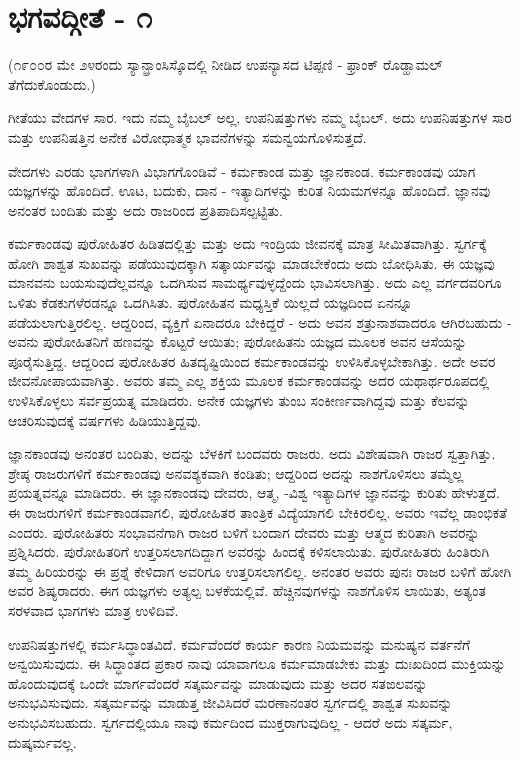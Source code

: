
\chapter{ಭಗವದ್ಗೀತೆ - ೧}

(೧೯೦೦ರ ಮೇ ೨೪ರಂದು ಸ್ಯಾನ್ಫ್ರಾಂಸಿಸ್ಕೊದಲ್ಲಿ ನೀಡಿದ ಉಪನ್ಯಾಸದ ಟಿಪ್ಪಣಿ - ಫ್ರಾಂಕ್ ರೊಡ್ಹಾಮಲ್ ತೆಗೆದುಕೊಂಡುದು.)

ಗೀತೆಯು ವೇದಗಳ ಸಾರ. ಇದು ನಮ್ಮ ಬೈಬಲ್ ಅಲ್ಲ, ಉಪನಿಷತ್ತುಗಳು ನಮ್ಮ ಬೈಬಲ್. ಅದು ಉಪನಿಷತ್ತುಗಳ ಸಾರ ಮತ್ತು ಉಪನಿಷತ್ತಿನ ಅನೇಕ ವಿರೋಧಾತ್ಮಕ ಭಾವನೆಗಳನ್ನು ಸಮನ್ವಯಗೊಳಿಸುತ್ತದೆ.

ವೇದಗಳು ಎರಡು ಭಾಗಗಳಾಗಿ ವಿಭಾಗಗೊಂಡಿವೆ - ಕರ್ಮಕಾಂಡ ಮತ್ತು ಜ್ಞಾನಕಾಂಡ. ಕರ್ಮಕಾಂಡವು ಯಾಗ ಯಜ್ಞಗಳನ್ನು ಹೊಂದಿದೆ. ಊಟ, ಬದುಕು, ದಾನ - ಇತ್ಯಾದಿಗಳನ್ನು ಕುರಿತ ನಿಯಮಗಳನ್ನೂ ಹೊಂದಿದೆ. ಜ್ಞಾನವು ಅನಂತರ ಬಂದಿತು ಮತ್ತು ಅದು ರಾಜರಿಂದ ಪ್ರತಿಪಾದಿಸಲ್ಪಟ್ಟಿತು.

ಕರ್ಮಕಾಂಡವು ಪುರೋಹಿತರ ಹಿಡಿತದಲ್ಲಿತ್ತು ಮತ್ತು ಅದು ಇಂದ್ರಿಯ ಜೀವನಕ್ಕೆ ಮಾತ್ರ ಸೀಮಿತವಾಗಿತ್ತು. ಸ್ವರ್ಗಕ್ಕೆ ಹೋಗಿ ಶಾಶ್ವತ ಸುಖವನ್ನು ಪಡೆಯುವುದಕ್ಕಾಗಿ ಸತ್ಕಾರ್ಯವನ್ನು ಮಾಡಬೇಕೆಂದು ಅದು ಬೋಧಿಸಿತು. ಈ ಯಜ್ಞವು ಮಾನವನು ಬಯಸುವುದೆಲ್ಲವನ್ನೂ ಒದಗಿಸುವ ಸಾಮರ್ಥ್ಯವುಳ್ಳದ್ದೆಂದು ಭಾವಿಸಲಾಗಿತ್ತು. ಅದು ಎಲ್ಲ ವರ್ಗದವರಿಗೂ ಒಳಿತು ಕೆಡಕುಗಳೆರಡನ್ನೂ ಒದಗಿಸಿತು. ಪುರೋಹಿತನ ಮಧ್ಯಸ್ತಿಕೆ ಯಿಲ್ಲದೆ ಯಜ್ಞದಿಂದ ಏನನ್ನೂ ಪಡೆಯಲಾಗುತ್ತಿರಲಿಲ್ಲ. ಆದ್ದರಿಂದ, ವ್ಯಕ್ತಿಗೆ ಏನಾದರೂ ಬೇಕಿದ್ದರೆ - ಅದು ಅವನ ಶತ್ರುನಾಶವಾದರೂ ಆಗಿರಬಹುದು - ಅವನು ಪುರೋಹಿತನಿಗೆ ಹಣವನ್ನು ಕೊಟ್ಟರೆ ಆಯಿತು; ಪುರೋಹಿತನು ಯಜ್ಞದ ಮೂಲಕ ಅವನ ಆಸೆಯನ್ನು ಪೂರೈಸುತ್ತಿದ್ದ. ಆದ್ದರಿಂದ ಪುರೋಹಿತರ ಹಿತದೃಷ್ಟಿಯಿಂದ ಕರ್ಮಕಾಂಡವನ್ನು ಉಳಿಸಿಕೊಳ್ಳಬೇಕಾಗಿತ್ತು. ಅದೇ ಅವರ ಜೀವನೋಪಾಯವಾಗಿತ್ತು. ಅವರು ತಮ್ಮ ಎಲ್ಲ ಶಕ್ತಿಯ ಮೂಲಕ ಕರ್ಮಕಾಂಡವನ್ನು ಅದರ ಯಥಾರ್ಥರೂಪದಲ್ಲಿ ಉಳಿಸಿಕೊಳ್ಳಲು ಸರ್ವಪ್ರಯತ್ನ ಮಾಡಿದರು. ಅನೇಕ ಯಜ್ಞಗಳು ತುಂಬ ಸಂಕೀರ್ಣವಾಗಿದ್ದವು ಮತ್ತು ಕೆಲವನ್ನು ಆಚರಿಸುವುದಕ್ಕೆ ವರ್ಷಗಳು ಹಿಡಿಯುತ್ತಿದ್ದವು.

ಜ್ಞಾನಕಾಂಡವು ಅನಂತರ ಬಂದಿತು, ಅದನ್ನು ಬೆಳಕಿಗೆ ಬಂದವರು ರಾಜರು. ಅದು ವಿಶೇಷವಾಗಿ ರಾಜರ ಸ್ವತ್ತಾಗಿತ್ತು. ಶ್ರೇಷ್ಠ ರಾಜರುಗಳಿಗೆ ಕರ್ಮಕಾಂಡವು ಅನವಶ್ಯಕವಾಗಿ ಕಂಡಿತು; ಆದ್ದರಿಂದ ಅದನ್ನು ನಾಶಗೊಳಿಸಲು ತಮ್ಮೆಲ್ಲ ಪ್ರಯತ್ನವನ್ನೂ ಮಾಡಿದರು. ಈ ಜ್ಞಾನಕಾಂಡವು ದೇವರು, ಆತ್ಮ, -ವಿಶ್ವ ಇತ್ಯಾದಿಗಳ ಜ್ಞಾನವನ್ನು ಕುರಿತು ಹೇಳುತ್ತದೆ. ಈ ರಾಜರುಗಳಿಗೆ ಕರ್ಮಕಾಂಡವಾಗಲಿ, ಪುರೋಹಿತರ ತಾಂತ್ರಿಕ ವಿದ್ಯೆಯಾಗಲಿ ಬೇಕಿರಲಿಲ್ಲ. ಅವರು ಇವೆಲ್ಲ ಡಾಂಭಿಕತೆ ಎಂದರು. ಪುರೋಹಿತರು ಸಂಭಾವನೆಗಾಗಿ ರಾಜರ ಬಳಿಗೆ ಬಂದಾಗ ದೇವರು ಮತ್ತು ಆತ್ಮದ ಕುರಿತಾಗಿ ಅವರನ್ನು ಪ್ರಶ್ನಿಸಿದರು. ಪುರೋಹಿತರಿಗೆ ಉತ್ತರಿಸಲಾಗದಿದ್ದಾಗ ಅವರನ್ನು ಹಿಂದಕ್ಕೆ ಕಳಿಸಲಾಯಿತು. ಪುರೋಹಿತರು ಹಿಂತಿರುಗಿ ತಮ್ಮ ಹಿರಿಯರನ್ನು ಈ ಪ್ರಶ್ನೆ ಕೇಳಿದಾಗ ಅವರಿಗೂ ಉತ್ತರಿಸಲಾಗಲಿಲ್ಲ. ಅನಂತರ ಅವರು ಪುನಃ ರಾಜರ ಬಳಿಗೆ ಹೋಗಿ ಅವರ ಶಿಷ್ಯರಾದರು. ಈಗ ಯಜ್ಞಗಳು ಅತ್ಯಲ್ಪ ಬಳಕೆಯಲ್ಲಿವೆ. ಹೆಚ್ಚಿನವುಗಳನ್ನು ನಾಶಗೊಳಿಸ ಲಾಯಿತು, ಅತ್ಯಂತ ಸರಳವಾದ ಭಾಗಗಳು ಮಾತ್ರ ಉಳಿದಿವೆ.

ಉಪನಿಷತ್ತುಗಳಲ್ಲಿ ಕರ್ಮಸಿದ್ಧಾಂತವಿದೆ. ಕರ್ಮವೆಂದರೆ ಕಾರ್ಯ ಕಾರಣ ನಿಯಮವನ್ನು ಮನುಷ್ಯನ ವರ್ತನೆಗೆ ಅನ್ವಯಿಸುವುದು. ಈ ಸಿದ್ಧಾಂತದ ಪ್ರಕಾರ ನಾವು ಯಾವಾಗಲೂ ಕರ್ಮಮಾಡಬೇಕು ಮತ್ತು ದುಃಖದಿಂದ ಮುಕ್ತಿಯನ್ನು ಹೊಂದುವುದಕ್ಕೆ ಒಂದೇ ಮಾರ್ಗವೆಂದರೆ ಸತ್ಕರ್ಮವನ್ನು ಮಾಡುವುದು ಮತ್ತು ಅದರ ಸತಙಲವನ್ನು ಅನುಭವಿಸುವುದು. ಸತ್ಕರ್ಮವನ್ನು ಮಾಡುತ್ತ ಜೀವಿಸಿದರೆ ಮರಣಾನಂತರ ಸ್ವರ್ಗದಲ್ಲಿ ಶಾಶ್ವತ ಸುಖವನ್ನು ಅನುಭವಿಸಬಹುದು. ಸ್ವರ್ಗದಲ್ಲಿಯೂ ನಾವು ಕರ್ಮದಿಂದ ಮುಕ್ತರಾಗುವುದಿಲ್ಲ - ಆದರೆ ಅದು ಸತ್ಕರ್ಮ, ದುಷ್ಕರ್ಮವಲ್ಲ.

